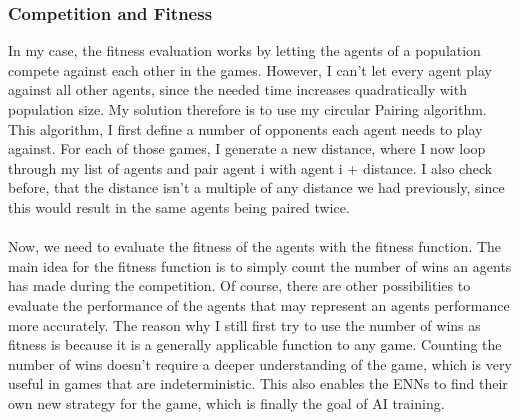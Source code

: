 \documentclass[11pt]{report}
\begin{document}
\begin{enumerate}
                \subsubsection{Competition and Fitness}
    In my case, the fitness evaluation works by letting the agents of a population compete against each other in the games.
    However, I can't let every agent play against all other agents, since the needed time increases quadratically with population size.
    My solution therefore is to use my circular Pairing algorithm.
    This algorithm, I first define a number of opponents each agent needs to play against.
    For each of those games, I generate a new distance, where I now loop through my list of agents and pair agent i with agent i + distance.
    I also check before, that the distance isn't a multiple of any distance we had previously, since this would result in the same agents being paired twice.
    \\ \\
    Now, we need to evaluate the fitness of the agents with the fitness function.
    The main idea for the fitness function is to simply count the number of wins an agents has made during the competition.
    Of course, there are other possibilities to evaluate the performance of the agents that may represent an agents performance more accurately.
    The reason why I still first try to use the number of wins as fitness is because it is a generally applicable function to any game.
    Counting the number of wins doesn't require a deeper understanding of the game, which is very useful in games that are indeterministic.
    This also enables the ENNs to find their own new strategy for the game, which is finally the goal of AI training.

\end{enumerate}
\end{document}
